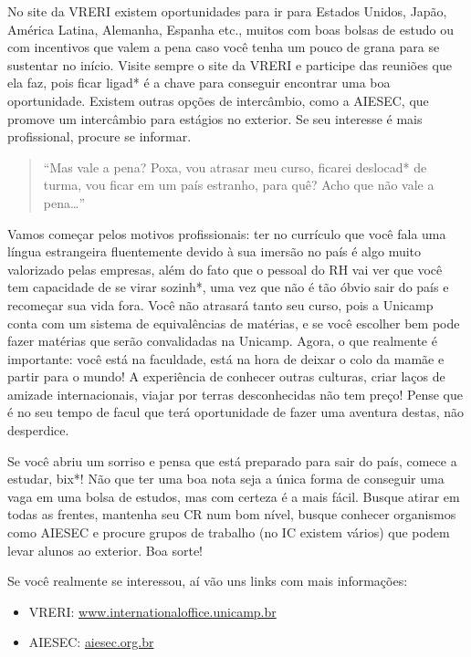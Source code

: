 No site da VRERI existem oportunidades para ir para Estados Unidos, Japão,
América Latina, Alemanha, Espanha etc., muitos com boas bolsas de estudo ou com
incentivos que valem a pena caso você tenha um pouco de grana para se sustentar
no início. Visite sempre o site da VRERI e participe das reuniões que ela faz,
pois ficar ligad* é a chave para conseguir encontrar uma boa
oportunidade. Existem outras opções de intercâmbio, como a AIESEC, que promove
um intercâmbio para estágios no exterior. Se seu interesse é mais profissional,
procure se informar.

\begin{quote}
``Mas vale a pena? Poxa, vou atrasar meu curso, ficarei deslocad* de turma, vou
ficar em um país estranho, para quê? Acho que não vale a pena{\dots}''
\end{quote}

Vamos começar pelos motivos profissionais: ter no currículo que você fala uma
língua estrangeira fluentemente devido à sua imersão no país é algo muito
valorizado pelas empresas, além do fato que o pessoal do RH vai ver que você
tem capacidade de se virar sozinh*, uma vez que não é tão óbvio sair do país e
recomeçar sua vida fora. Você não atrasará tanto seu curso, pois a Unicamp
conta com um sistema de equivalências de matérias, e se você escolher bem pode
fazer matérias que serão convalidadas na Unicamp. Agora, o que realmente é
importante: você está na faculdade, está na hora de deixar o colo da mamãe e
partir para o mundo! A experiência de conhecer outras culturas, criar laços de
amizade internacionais, viajar por terras desconhecidas não tem preço! Pense
que é no seu tempo de facul que terá oportunidade de fazer uma aventura destas,
não desperdice.

Se você abriu um sorriso e pensa que está preparado para sair do país, comece a
estudar, bix*! Não que ter uma boa nota seja a única forma de conseguir uma
vaga em uma bolsa de estudos, mas com certeza é a mais fácil.  Busque atirar em
todas as frentes, mantenha seu CR num bom nível, busque conhecer organismos
como AIESEC e procure grupos de trabalho (no IC existem vários) que podem levar
alunos ao exterior. Boa sorte!

Se você realmente se interessou, aí vão uns links com mais informações:

\begin{itemize}
    \item  VRERI: \url{www.internationaloffice.unicamp.br}
    \item  AIESEC: \url{aiesec.org.br}
\end{itemize}

